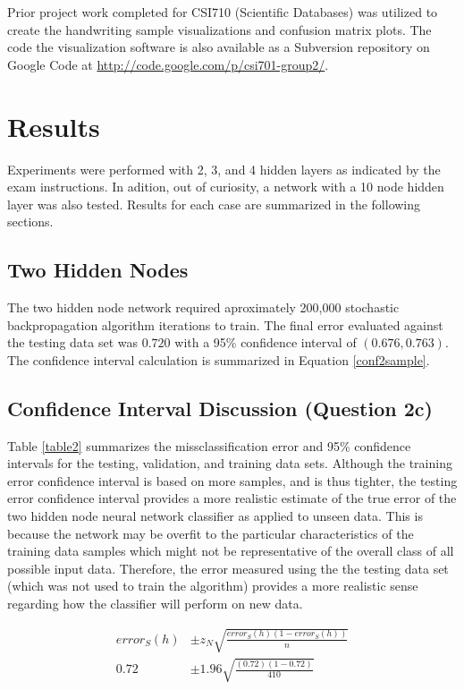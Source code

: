 \documentclass{article}
\begin{document}
Prior project work completed for CSI710 (Scientific Databases) was utilized to create the handwriting sample visualizations and confusion matrix plots. The code the visualization software is also available as a Subversion repository on Google Code at \url{http://code.google.com/p/csi701-group2/}.

\section{Results}\label{Results}

Experiments were performed with 2, 3, and 4 hidden layers as indicated by the exam instructions. In adition, out of curiosity, a network with a 10 node hidden layer was also tested. Results for each case are summarized in the following sections.

\subsection{Two Hidden Nodes}\label{hidden2}

The two hidden node network required aproximately 200,000 stochastic backpropagation algorithm iterations to train. The final error evaluated against the testing data set was \(0.720\) with a 95\% confidence interval of \((0.676 , 0.763)\). The confidence interval calculation is summarized in Equation \ref{conf2sample}.

\subsection{Confidence Interval Discussion (Question 2c)}\label{conf2}

Table \ref{table2} summarizes the missclassification error and 95\% confidence intervals for the testing, validation, and training data sets. Although the training error confidence interval is based on more samples, and is thus tighter, the testing error confidence interval provides a more realistic estimate of the true error of the two hidden node neural network classifier as applied to unseen data. This is because the network may be overfit to the particular characteristics of the training data samples which might not be representative of the overall class of all possible input data. Therefore, the error measured using the the testing data set (which was not used to train the algorithm) provides a more realistic sense regarding how the classifier will perform on new data. 

\begin{equation}\label{conf2sample}
\begin{split}
error_{S}(h) &\pm z_{N}\sqrt{\frac{error_{S}(h)(1-error_{S}(h))}{n}} \\
0.72 &\pm 1.96\sqrt{\frac{(0.72)(1-0.72)}{410}} 
\end{split}
\end{equation}
\end{document}

